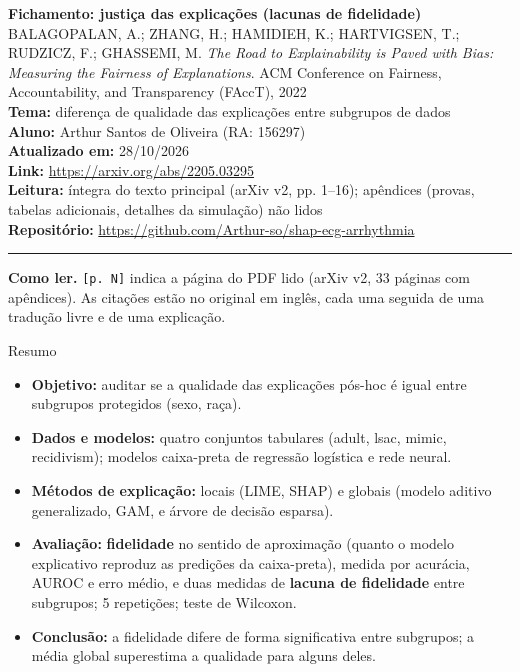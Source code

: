 \documentclass[11pt,a4paper]{article}
\begin{document}
\begin{center}
    {\LARGE \textbf{Fichamento: justiça das explicações (lacunas de fidelidade)}} \\[0.35em]
    {\large BALAGOPALAN, A.; ZHANG, H.; HAMIDIEH, K.; HARTVIGSEN, T.; RUDZICZ, F.; GHASSEMI, M. \textit{The Road to Explainability is Paved with Bias: Measuring the Fairness of Explanations}. ACM Conference on Fairness, Accountability, and Transparency (FAccT), 2022} \\[0.3em]
    \textbf{Tema:} diferença de qualidade das explicações entre subgrupos de dados \\[0.2em]
    \textbf{Aluno:} Arthur Santos de Oliveira (RA: 156297) \\[0.2em]
    \textbf{Atualizado em:} 28/10/2026 \\[0.2em]
    \textbf{Link:} \url{https://arxiv.org/abs/2205.03295} \\[0.2em]
    \textbf{Leitura:} íntegra do texto principal (arXiv v2, pp. 1--16); apêndices (provas, tabelas adicionais, detalhes da simulação) não lidos \\[0.2em]
    \textbf{Repositório:} \url{https://github.com/Arthur-so/shap-ecg-arrhythmia}
\end{center}
\vspace{-0.5em}
\hrule
\vspace{0.8em}

\textbf{Como ler.} \texttt{[p. N]} indica a página do PDF lido (arXiv v2, 33 páginas com apêndices). As citações estão no original em inglês, cada uma seguida de uma tradução livre e de uma explicação.

\begin{infobox}[note]{Resumo}
\begin{itemize}
  \item \textbf{Objetivo:} auditar se a qualidade das explicações pós-hoc é igual entre subgrupos protegidos (sexo, raça).
  \item \textbf{Dados e modelos:} quatro conjuntos tabulares (adult, lsac, mimic, recidivism); modelos caixa-preta de regressão logística e rede neural.
  \item \textbf{Métodos de explicação:} locais (LIME, SHAP) e globais (modelo aditivo generalizado, GAM, e árvore de decisão esparsa).
  \item \textbf{Avaliação:} \textbf{fidelidade} no sentido de aproximação (quanto o modelo explicativo reproduz as predições da caixa-preta), medida por acurácia, AUROC e erro médio, e duas medidas de \textbf{lacuna de fidelidade} entre subgrupos; 5 repetições; teste de Wilcoxon.
  \item \textbf{Conclusão:} a fidelidade difere de forma significativa entre subgrupos; a média global superestima a qualidade para alguns deles.
\end{itemize}
\end{infobox}
\end{document}
